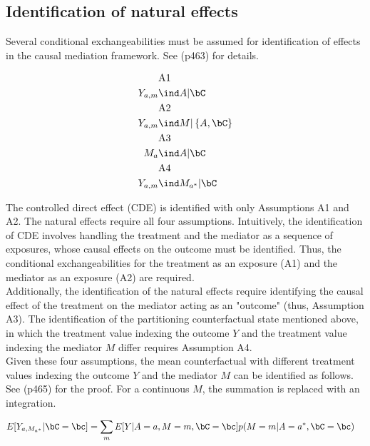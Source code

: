 \documentclass[dvipdfmx,10pt]{article}
\begin{document}
\subsection{Identification of natural effects}
\label{sec:org603615e}
Several conditional exchangeabilities must be assumed for identification of effects in the causal mediation framework. See \cite{vanderweeleExplanationCausalInference2015} (p463) for details.

\begin{align*}
  &\text{A1}\\
  Y_{a,m} &\ind A | \bC\\
  &\text{A2}\\
  Y_{a,m} &\ind M | \left\{ A, \bC \right\}\\
  &\text{A3}\\
  M_{a} &\ind A | \bC\\
  &\text{A4}\\
  Y_{a,m} &\ind M_{a^{*}} |\bC\\
\end{align*}

The controlled direct effect (CDE) is identified with only Assumptions A1 and A2. The natural effects require all four assumptions.  Intuitively, the identification of CDE involves handling the treatment and the mediator as a sequence of exposures, whose causal effects on the outcome must be identified. Thus, the conditional exchangeabilities for the treatment as an exposure (A1) and the mediator as an exposure (A2) are required.\\

Additionally, the identification of the natural effects require identifying the causal effect of the treatment on the mediator acting as an "outcome" (thus, Assumption A3). The identification of the partitioning counterfactual state mentioned above, in which the treatment value indexing the outcome \(Y\) and the treatment value indexing the mediator \(M\) differ requires Assumption A4.\\

Given these four assumptions, the mean counterfactual with different treatment values indexing the outcome \(Y\) and the mediator \(M\) can be identified as follows. See \cite{vanderweeleExplanationCausalInference2015} (p465) for the proof. For a continuous \(M\), the summation is replaced with an integration.

\begin{align*}
E[Y_{a,M_{a^{*}}} | \bC = \bc] &= \sum_{m} E[Y | A = a, M = m, \bC = \bc] p(M = m | A = a^{*}, \bC = \bc)
\end{align*}
\end{document}
